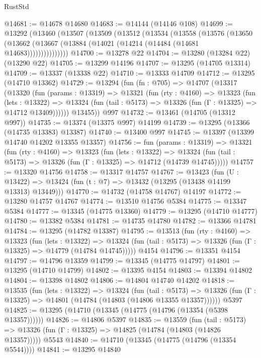 \begin{lexlean}{RustStd}
\begin{coremodule}
@14681 := @14678 @14680
@14683 := @14144 (@14146 @108)
@14699 := @13292
    (@13460
      (@13507
        (@13509
          (@13512
            (@13534
              (@13558
                (@13576
                  (@13650
                    (@13662 (@13667 (@13884 (@14021 (@14214 (@14484 (@14681 @14683)))))))))))))))
@14700 := @13278 @22
@14704 := @13280 (@13284 @22) (@13290 @22)
@14705 := @13299 @14196
@14707 := @13295 (@14705 @13314)
@14709 := @13337 (@13338 @22)
@14710 := @13333 @14709
@14712 := @13295 (@14710 @13362)
@14729 := @13294
    (fun (fn : @705) =>
    @14707
      (@13317
        (@13320
          (fun (params : @13319) =>
          @13321
            (fun (rty : @4160) =>
            @13323
              (fun (lets : @13322) =>
              @13324 (fun (tail : @5173) => @13326 (fun (Γ : @13325) => @14712 @13409))))))
        @13455))
    @997
@14732 := @13461 (@14705 (@13312 @997))
@14735 := @13374 (@13375 @997) @14199
@14739 := @13295 (@13366 (@14735 @13383) @13387)
@14740 := @13400 @997
@14745 := @13397 (@13399 @14740 @14202 @13355 @13357)
@14756 := fun (params : @13319) =>
  @13321
    (fun (rty : @4160) =>
    @13323
      (fun (lets : @13322) =>
      @13324 (fun (tail : @5173) => @13326 (fun (Γ : @13325) => @14712 (@14739 @14745)))))
@14757 := @13320 @14756
@14758 := @13317 @14757
@14767 := @13423
    (fun (U : @13422) => @13424 (fun (t : @7) => @13432 (@13295 (@13438 @14199 @13313) @13449)))
@14770 := @14732 (@14758 @14767) @14197
@14772 := @13280 @14757 @14767
@14774 := @13510 @14756 @5384
@14775 := @13347 @5384
@14777 := @13345 (@14775 @13360)
@14779 := @13295 (@14710 @14777)
@14780 := @13382 @5384
@14781 := @14735 @14780
@14782 := @13366 @14781
@14784 := @13295 (@14782 @13387)
@14795 := @13513
    (fun (rty : @4160) =>
    @13323
      (fun (lets : @13322) =>
      @13324 (fun (tail : @5173) => @13326 (fun (Γ : @13325) => @14779 (@14784 @14745)))))
    @4154
@14796 := @13351 @4154
@14797 := @14796 @13359
@14799 := @13345 (@14775 @14797)
@14801 := @13295 (@14710 @14799)
@14802 := @13395 @4154
@14803 := @13394 @14802
@14804 := @13398 @14802
@14806 := @14804 @14740 @14202
@14818 := @13535
    (fun (lets : @13322) =>
    @13324
      (fun (tail : @5173) =>
      @13326 (fun (Γ : @13325) => @14801 (@14784 (@14803 (@14806 @13355 @13357))))))
    @5397
@14825 := @13295 (@14710 (@13345 (@14775 (@14796 (@13354 (@5398 @13357))))))
@14826 := @14806 @5397
@14835 := @13559
    (fun (tail : @5173) => @13326 (fun (Γ : @13325) => @14825 (@14784 (@14803 (@14826 @13357)))))
    @5543
@14840 := @14710 (@13345 (@14775 (@14796 (@13354 @5544))))
@14841 := @13295 @14840

\end{coremodule}
\end{lexlean}
